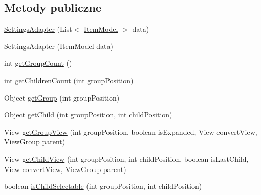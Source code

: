 \subsection*{Metody publiczne}
\begin{DoxyCompactItemize}
\item 
\hyperlink{classpl_1_1edu_1_1uwb_1_1mobiuwb_1_1view_1_1settings_1_1adapter_1_1_settings_adapter_a1aca8d564da4844a56b14776f7a9a0fc}{Settings\+Adapter} (List$<$ \hyperlink{classpl_1_1edu_1_1uwb_1_1mobiuwb_1_1view_1_1settings_1_1adapter_1_1items_1_1_item_model}{Item\+Model} $>$ data)
\item 
\hyperlink{classpl_1_1edu_1_1uwb_1_1mobiuwb_1_1view_1_1settings_1_1adapter_1_1_settings_adapter_a500cb453dd2a890db9ca5a21a246a7c8}{Settings\+Adapter} (\hyperlink{classpl_1_1edu_1_1uwb_1_1mobiuwb_1_1view_1_1settings_1_1adapter_1_1items_1_1_item_model}{Item\+Model} data)
\item 
int \hyperlink{classpl_1_1edu_1_1uwb_1_1mobiuwb_1_1view_1_1settings_1_1adapter_1_1_settings_adapter_a8c226a6283ffaaec32fe96e91bf39b0f}{get\+Group\+Count} ()
\item 
int \hyperlink{classpl_1_1edu_1_1uwb_1_1mobiuwb_1_1view_1_1settings_1_1adapter_1_1_settings_adapter_af655795610d66a55e801ead9bc860e65}{get\+Children\+Count} (int group\+Position)
\item 
Object \hyperlink{classpl_1_1edu_1_1uwb_1_1mobiuwb_1_1view_1_1settings_1_1adapter_1_1_settings_adapter_a2c818201307b0df2c321c54fad53a408}{get\+Group} (int group\+Position)
\item 
Object \hyperlink{classpl_1_1edu_1_1uwb_1_1mobiuwb_1_1view_1_1settings_1_1adapter_1_1_settings_adapter_ae3be6d2465a2729aa7c7e6cbce2bdbc3}{get\+Child} (int group\+Position, int child\+Position)
\item 
View \hyperlink{classpl_1_1edu_1_1uwb_1_1mobiuwb_1_1view_1_1settings_1_1adapter_1_1_settings_adapter_ac4786fa0f0507c5773ab0e1a3e562a03}{get\+Group\+View} (int group\+Position, boolean is\+Expanded, View convert\+View, View\+Group parent)
\item 
View \hyperlink{classpl_1_1edu_1_1uwb_1_1mobiuwb_1_1view_1_1settings_1_1adapter_1_1_settings_adapter_a50f1520d4716c257c4e8af4750239814}{get\+Child\+View} (int group\+Position, int child\+Position, boolean is\+Last\+Child, View convert\+View, View\+Group parent)
\item 
boolean \hyperlink{classpl_1_1edu_1_1uwb_1_1mobiuwb_1_1view_1_1settings_1_1adapter_1_1_settings_adapter_af54433f2e32b5f4a3c27c16de994f465}{is\+Child\+Selectable} (int group\+Position, int child\+Position)

\end{DoxyCompactItemize}

